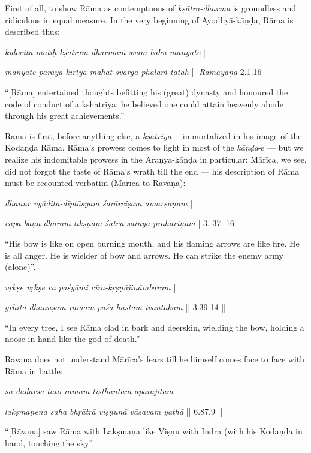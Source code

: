 First of all, to show Rāma as contemptuous of {\sl kṣātra-dharma} is groundless and ridiculous in equal measure. In the very beginning of Ayodhyā-kāṇḍa, Rāma is described thus:

\begin{myquote}
{{\sl kulocita-matiḥ kṣātraṁ dharmaṁ svaṁ bahu manyate}} |

{\sl manyate parayā kīrtyā mahat svarga-phalaṁ tataḥ} || {\sl Rāmāyaṇa} 2.1.16
\end{myquote}

\begin{myquote}
“[Rāma] entertained thoughts befitting his (great) dynasty and honoured the code of conduct of a kshatriya; he believed one could attain heavenly abode through his great achievements.”
\end{myquote}

Rāma is first, before anything else, a {\sl kṣatriya}--- immortalized in his image of the Kodaṇḍa Rāma. Rāma’s prowess comes to light in most of the {\sl kāṇḍa}-s --- but we realize his indomitable prowess in the Araṇya-kāṇḍa in particular: Mārīca, we see, did not forgot the taste of Rāma’s wrath till the end --- his description of Rāma must be recounted verbatim (Mārīca to Rāvaṇa): 

\newpage

\begin{myquote}
{{\sl dhanur vyādita-dīptāsyam śarārciṣam amarṣaṇam}} |
 
{\sl cāpa-bāṇa-dharam tīkṣṇam śatru-sainya-prahāriṇam} | 3. 37. 16 | 

“His bow is like on open burning mouth, and his flaming arrows are like fire. He is all anger. He is wielder of bow and arrows. He can strike the enemy army (alone)”. 
\end{myquote}

\begin{myquote}
{{\sl vṛkṣe vṛkṣe ca paśyāmi cīra-kṛṣṇājināmbaram}} |


{\sl gṛhīta-dhanuṣam rāmam pāśa-hastam ivāntakam} || 3.39.14 || 

“In every tree, I see Rāma clad in bark and deerskin, wielding the bow, holding a noose in hand like the god of death.”
\end{myquote}

Ravana does not understand Mārīca’s fears till he himself comes face to face with Rāma in battle: 

\begin{myquote}
{{\sl sa dadarsa tato rāmam tiṣṭhantam aparājitam}} |

{\sl lakṣmaṇena saha bhṛātrā viṣṇunā vāsavam yathā} || 6.87.9 || 


“[Rāvaṇa] saw Rāma with Lakṣmaṇa like Viṣṇu with Indra (with his Kodaṇḍa in hand, touching the sky”. 
\end{myquote}

